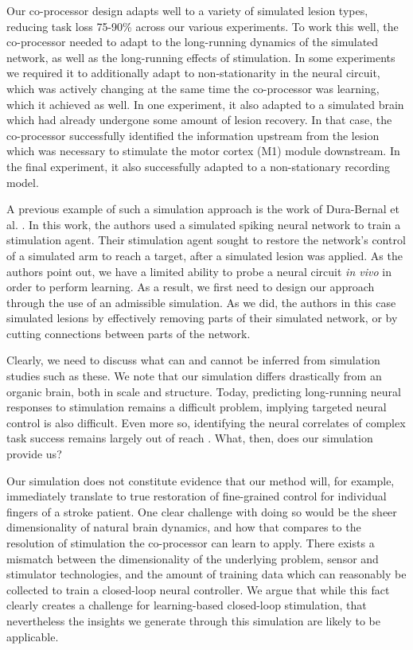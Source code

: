 \documentclass[12pt]{iopart}
\begin{document}
Our co-processor design adapts well to a variety of simulated lesion types, reducing task loss
75-90\% across our various experiments. To work this well, the co-processor needed to adapt to
the long-running dynamics of the simulated network, as well as the long-running effects of
stimulation. In some experiments we required it to additionally adapt to non-stationarity in
the neural circuit, which was actively changing at the same time the co-processor was learning, which it achieved as well. In one experiment, it also adapted to a simulated brain which had already undergone some amount of
lesion recovery. In that case, the co-processor successfully identified the information upstream
from the lesion which was necessary to stimulate the motor cortex (M1) module
downstream. In the final experiment, it also successfully adapted to a non-stationary recording model.

A previous example of such a simulation approach is the work of Dura-Bernal et al. \cite{bernal.sim}. In this work, the
authors used a simulated spiking neural network to train a stimulation agent.
Their stimulation agent sought to restore the network's
control of a simulated arm to reach a target, after a simulated lesion was
applied. As the authors point out, we have a limited ability to
probe a neural circuit \textit{in vivo} in order to perform learning. As a result,
we first need to design our approach through the use of an admissible simulation.
As we did, the authors in this case simulated lesions by effectively removing parts
of their simulated network, or by cutting connections between parts of the network.

Clearly, we need to discuss what can and cannot be inferred from simulation studies
such as these. We note that our simulation differs drastically from an organic brain, both in scale and structure. Today, predicting long-running neural responses
to stimulation remains a difficult problem, implying targeted neural control is also difficult. Even
more so, identifying the neural correlates of complex task success remains largely out of reach
\cite{khanna.openloop}. What, then, does our simulation provide us?

Our simulation does not constitute evidence that our method will, for example, immediately translate
to true restoration of fine-grained control for individual fingers of a stroke patient. One clear
challenge with doing so would be the sheer dimensionality of natural brain dynamics, and how
that compares to the resolution of stimulation the co-processor can learn to apply.
There exists a  mismatch between the dimensionality of the underlying problem, sensor and
stimulator technologies, and the amount of training data which can reasonably be collected to
train a closed-loop neural controller. We argue that while this fact clearly creates a challenge
for learning-based closed-loop stimulation, that nevertheless the insights we generate through this
simulation are likely to be applicable.
\end{document}

